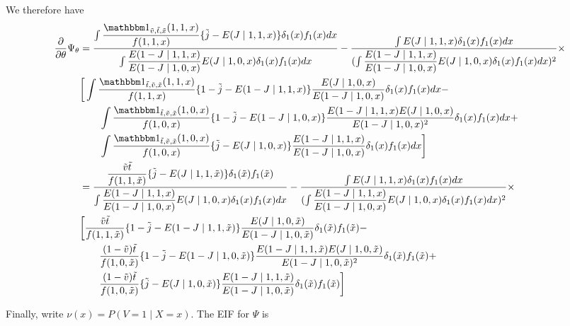 \documentclass{article}
\begin{document}
We therefore have
\begin{align*}
    \dfrac{\partial}{\partial\theta}\Psi_\theta &= 
    \dfrac{\int \dfrac{\mathbbm 1_{\tilde v, \tilde t, \tilde x}(1, 1, x)}{f(1, 1, x)}\{\tilde j - E(J\mid 1, 1, x)\}\delta_1(x)f_1(x)dx}{\int \dfrac{E(1-J\mid 1, 1, x)}{E(1-J\mid 1, 0, x)}E(J\mid 1, 0, x)\delta_1(x)f_1(x)dx} -\dfrac{\int E(J\mid 1, 1, x)\delta_1(x)f_1(x)dx}{(\int \dfrac{E(1-J\mid 1, 1, x)}{E(1-J\mid 1, 0, x)}E(J\mid 1, 0, x)\delta_1(x)f_1(x)dx)^2}\times\\
    &\bigg[ \int \dfrac{\mathbbm 1_{\tilde t, \tilde v, \tilde x}(1, 1, x)}{f(1, 1, x)}\{1-\tilde j - E(1-J\mid 1, 1, x)\}\dfrac{E(J\mid 1, 0, x)}{E(1-J\mid 1, 0, x)}\delta_1(x)f_1(x)dx -\\
    &\qquad \int \dfrac{\mathbbm 1_{\tilde t, \tilde v, \tilde x}(1, 0, x)}{f(1, 0, x)}\{1-\tilde j - E(1-J\mid 1, 0, x)\}\dfrac{E(1-J\mid 1, 1, x)E(J\mid 1, 0, x)}{E(1-J\mid 1, 0, x)^2}\delta_1(x)f_1(x)dx + \\
    &\qquad \int \dfrac{\mathbbm 1_{\tilde t, \tilde v, \tilde x}(1, 0, x)}{f(1, 0, x)}\{\tilde j - E(J\mid 1, 0, x)\}\dfrac{E(1-J\mid 1, 1, x)}{E(1-J\mid 1, 0, x)}\delta_1(x)f_1(x)dx\bigg]\\
    &= \dfrac{\dfrac{\tilde v\tilde t}{f(1, 1, \tilde x)}\{\tilde j - E(J\mid 1, 1, \tilde x)\}\delta_1(\tilde x)f_1(\tilde x)}{\int \dfrac{E(1-J\mid 1, 1, x)}{E(1-J\mid 1, 0, x)}E(J\mid 1, 0, x)\delta_1(x)f_1(x)dx} -\dfrac{\int E(J\mid 1, 1, x)\delta_1(x)f_1(x)dx}{(\int \dfrac{E(1-J\mid 1, 1, x)}{E(1-J\mid 1, 0, x)}E(J\mid 1, 0, x)\delta_1(x)f_1(x)dx)^2}\times\\
    &\bigg[ \dfrac{\tilde v\tilde t}{f(1, 1, \tilde x)}\{1-\tilde j - E(1-J\mid 1, 1, \tilde x)\}\dfrac{E(J\mid 1, 0, \tilde x)}{E(1-J\mid 1, 0, \tilde x)}\delta_1(\tilde x)f_1(\tilde x) -\\
    &\qquad  \dfrac{(1-\tilde v)\tilde t}{f(1, 0, \tilde x)}\{1-\tilde j - E(1-J\mid 1, 0, \tilde x)\}\dfrac{E(1-J\mid 1, 1, \tilde x)E(J\mid 1, 0, \tilde x)}{E(1-J\mid 1, 0, \tilde x)^2}\delta_1(\tilde x)f_1(\tilde x) + \\
    &\qquad  \dfrac{(1-\tilde v)\tilde t}{f(1, 0, \tilde x)}\{\tilde j - E(J\mid 1, 0, \tilde x)\}\dfrac{E(1-J\mid 1, 1, \tilde x)}{E(1-J\mid 1, 0, \tilde x)}\delta_1(\tilde x)f_1(\tilde x)\bigg]
\end{align*}

Finally, write $\nu(x)=P(V=1\mid X=x)$. The EIF for $\Psi$ is 
\end{document}
